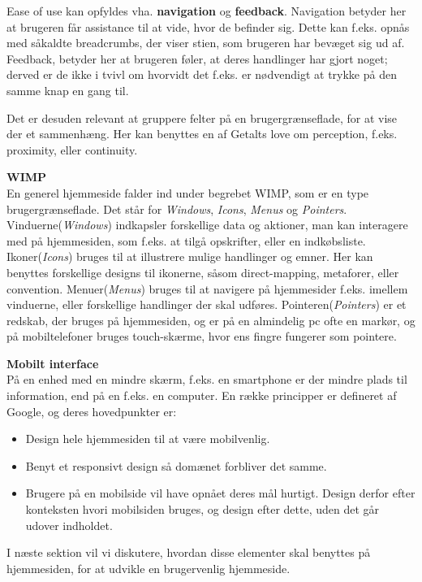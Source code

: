 Ease of use kan opfyldes vha. \textbf{navigation} og \textbf{feedback}.
Navigation betyder her at brugeren får assistance til at vide, hvor de befinder sig.
Dette kan f.eks. opnås med såkaldte breadcrumbs, der viser stien, som brugeren har bevæget sig ud af.
Feedback, betyder her at brugeren føler, at deres handlinger har gjort noget; derved er de ikke i tvivl om hvorvidt det f.eks. er nødvendigt at trykke på den samme knap en gang til.

Det er desuden relevant at gruppere felter på en brugergrænseflade, for at vise der et sammenhæng. 
Her kan benyttes en af Getalts love om perception, f.eks. proximity, eller continuity.\citep{DIS2014}

\textbf{WIMP}\hfill\\
En generel hjemmeside falder ind under begrebet WIMP, som er en type brugergrænseflade.
Det står for \textit{Windows}, \textit{Icons}, \textit{Menus} og \textit{Pointers}.
Vinduerne(\textit{Windows}) indkapsler forskellige data og aktioner, man kan interagere med på hjemmesiden, som f.eks. at tilgå opskrifter, eller en indkøbsliste.
Ikoner(\textit{Icons}) bruges til at illustrere mulige handlinger og emner.
Her kan benyttes forskellige designs til ikonerne, såsom direct-mapping, metaforer, eller convention.
Menuer(\textit{Menus}) bruges til at navigere på hjemmesider f.eks. imellem vinduerne, eller forskellige handlinger der skal udføres.
Pointeren(\textit{Pointers}) er et redskab, der bruges på hjemmesiden, og er på en almindelig pc ofte en markør, og på mobiltelefoner bruges touch-skærme, hvor ens fingre fungerer som pointere.


\textbf{Mobilt interface}\hfill\\
På en enhed med en mindre skærm, f.eks. en smartphone er der mindre plads til information, end på en f.eks. en computer. 
En række principper er defineret af Google\citep{Mobil}, og deres hovedpunkter er:
\begin{itemize}[nolistsep,noitemsep]
	\item Design hele hjemmesiden til at være mobilvenlig.
	\item Benyt et responsivt design så domænet forbliver det samme.
	\item Brugere på en mobilside vil have opnået deres mål hurtigt. Design derfor efter konteksten hvori mobilsiden bruges, og design efter dette, uden det går udover indholdet.
\end{itemize}

I næste sektion vil vi diskutere, hvordan disse elementer skal benyttes på hjemmesiden, for at udvikle en brugervenlig hjemmeside.

